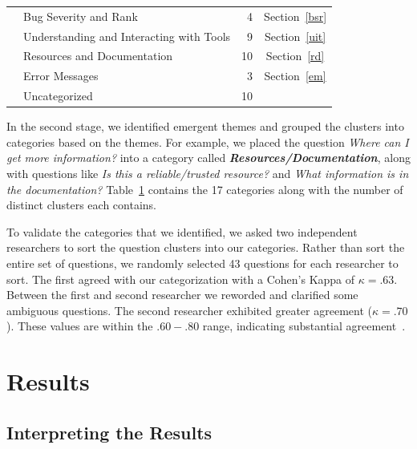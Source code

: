 \documentclass{acm_proc_article-sp}
\begin{document}
\begin{table}
\begin{tabular}{|l|l|r|c|}
    									& Bug Severity and Rank											& 4     		& Section~\ref{bsr}		\\

    									& Understanding and Interacting with Tools						& 9     		& Section~\ref{uit}			\\

   	 									& Resources and Documentation									& 10     		& Section~\ref{rd}		\\

    									& Error Messages												& 3     		& Section~\ref{em}		\\
    \hline	
       									& Uncategorized													& 10    		&			 \\
    \hline
\end{tabular}
\label{table:categories}
\end{table}


In the second stage, we identified emergent themes and grouped the clusters into categories based on the themes. 
For example, we placed the question \textit{Where can I get more information?} into a category called \emph{\textbf{Resources/Documentation}}, along with questions like \textit{Is this a reliable/trusted resource?} and \textit{What information is in the documentation?} 
Table~\ref{table:categories} contains the 17 categories along with the number of distinct clusters each contains. 

To validate the categories that we identified, we asked two independent researchers to sort the question clusters into our categories. 
Rather than sort the entire set of questions, we randomly selected 43 questions for each researcher to sort.
The first agreed with our categorization with a Cohen's Kappa of $\kappa = .63$. 
Between the first and second researcher we reworded and clarified some ambiguous questions. The second researcher exhibited greater agreement ($\kappa = .70$). 
These values are within the $.60 - .80$ range, indicating substantial agreement~\cite{Landis1977agreement}.

\section{Results}

\subsection{Interpreting the Results}
\label{sec:results}
\end{document}
